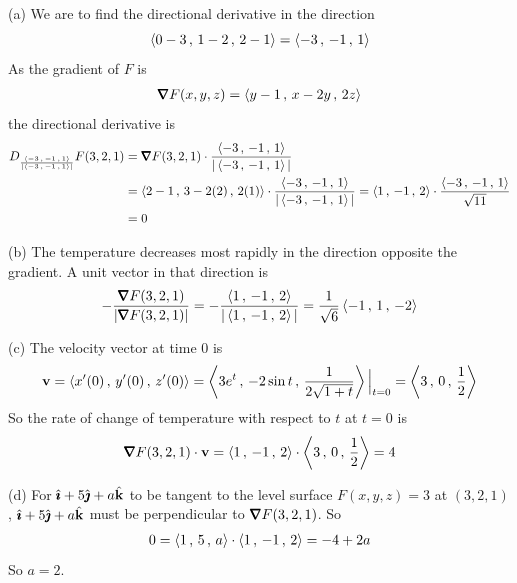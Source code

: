 \begin{solution}
(a) 
We are to find the directional derivative in the direction
\begin{equation*}
\left< 0-3\,,\,1-2\,,\,2-1\right> = \left< -3\,,\,-1\,,\,1\right>
\end{equation*}
As the gradient of $F$ is
\begin{align*}
\vnabla F(x,y,z) = \llt y-1\,,\,x-2y\,,\,2z \rgt
\end{align*}
the directional derivative is
\begin{align*}
D_{\frac{\llt -3\,,\,-1\,,\,1\rgt}{|\llt -3\,,\,-1\,,\,1\rgt|}}F(3,2,1)
&=\vnabla F(3,2,1)\cdot 
  \frac{\llt -3\,,\,-1\,,\,1\rgt}{|\llt -3\,,\,-1\,,\,1\rgt|} \\
&= \llt 2-1\,,\,3-2(2)\,,\,2(1) \rgt
\cdot   \frac{\llt -3\,,\,-1\,,\,1\rgt}{|\llt -3\,,\,-1\,,\,1\rgt|}
=\llt 1\,,\,-1\,,\,2\rgt \cdot   \frac{\llt -3\,,\,-1\,,\,1\rgt}{\sqrt{11}}\\
&=0
\end{align*}

(b) The temperature decreases most rapidly in the direction opposite the
gradient. A unit vector in that direction is
\begin{align*}
   -\frac{\vnabla F(3,2,1)}{|\vnabla F(3,2,1)|}
=  -\frac{\llt 1\,,\,-1\,,\,2 \rgt}{|\llt 1\,,\,-1\,,\,2 \rgt|}
= \frac{1}{\sqrt{6}}\llt -1\,,\,1\,,\,-2 \rgt 
\end{align*}

(c) The velocity vector at time $0$ is
\begin{align*}
\mathbf{v}=\left< x'(0)\,,\,y'(0)\,,\,z'(0)\right>
=\left< 3e^t\,,\,-2\sin t\,,\,\frac{1}{2\sqrt{1+t}}\right>\Big|_{t=0}
=\left< 3\,,\,0\,,\,\frac{1}{2}\right>
\end{align*}
So the rate of change of temperature with respect to $t$ at $t=0$ is
\begin{align*}
\vnabla F(3,2,1)\cdot \vv
=\llt 1\,,\,-1\,,\,2 \rgt\cdot 
   \llt 3\,,\,0\,,\,\frac{1}{2}\rgt
=4
\end{align*}

(d) For $\hat{\pmb{\imath}}+5\hat{\pmb{\jmath}}+a\hat{\mathbf{k}}$ to be tangent to the level surface
$F(x, y, z) = 3$ at $(3, 2, 1)$, $\hat{\pmb{\imath}}+5\hat{\pmb{\jmath}}+a\hat{\mathbf{k}}$ must be perpendicular
to  $\vnabla F(3,2,1)$. So
\begin{align*}
0=\left< 1\,,\,5\,,\,a \right> \cdot \left< 1\,,\,-1\,,\,2 \right>
 = -4+2a
\end{align*}
So $a=2$.
\end{solution}


